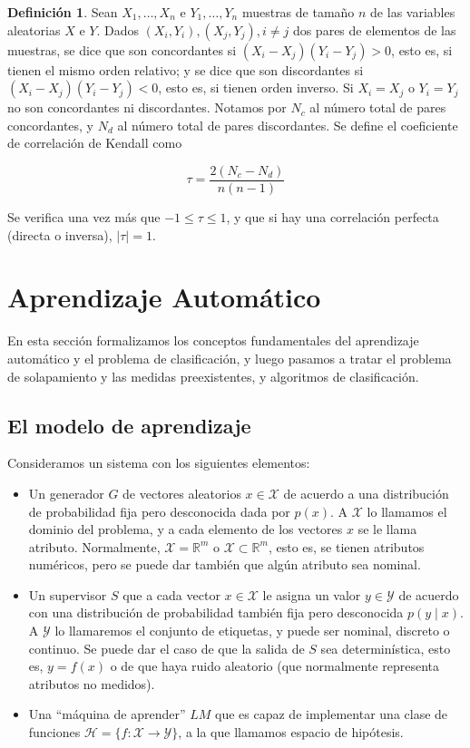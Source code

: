 \documentclass[a4paper,12pt]{report}
\theoremstyle{definition}
\newtheorem{dfn}{Definición}
\begin{document}
\begin{dfn}
  Sean $X_1, \ldots, X_n$ e $Y_1, \ldots, Y_n$ muestras de tamaño $n$ de las variables aleatorias $X$ e $Y$.
  Dados $(X_i, Y_i), (X_j, Y_j), i \neq j$ dos pares de elementos de las muestras, se dice que son concordantes si $(X_i-X_j)(Y_i-Y_j) > 0$, esto es,
  si tienen el mismo orden relativo; y se dice que son discordantes si $(X_i-X_j)(Y_i-Y_j) < 0$, esto es,
  si tienen orden inverso. Si $X_i = X_j$ o $Y_i = Y_j$ no son concordantes ni discordantes.
  Notamos por $N_c$ al número total de pares concordantes, y $N_d$ al número total de pares discordantes.
  Se define el coeficiente de correlación de Kendall como

  $$ \tau = \frac{2(N_c - N_d)}{n(n-1)}$$
\end{dfn}

Se verifica una vez más que $-1 \leq \tau \leq 1$, y que si hay una correlación perfecta (directa o inversa), $\lvert \tau \rvert = 1$.

\section{Aprendizaje Automático}
\label{sec:ml}

En esta sección formalizamos los conceptos fundamentales del aprendizaje automático y el problema de clasificación, y luego pasamos a tratar el problema de solapamiento y las medidas preexistentes, y algoritmos de clasificación.

\subsection{El modelo de aprendizaje}
Consideramos un sistema con los siguientes elementos\cite{cherkassky2007learning, shalev2014understanding, vapnik1998statistical}:
\begin{itemize}
\item Un generador $G$ de vectores aleatorios $x \in \mathcal{X}$
  de acuerdo a una distribución de probabilidad fija pero desconocida dada por $p(x)$. A $\mathcal{X}$ lo llamamos el dominio del problema, y a cada elemento de los vectores $x$ se le llama atributo. Normalmente, $\mathcal{X} = \mathbb{R}^m$ o $\mathcal{X} \subset \mathbb{R}^m$, esto es, se tienen atributos numéricos, pero se puede dar también que algún atributo sea nominal.
\item Un supervisor $S$ que a cada vector $x \in \mathcal{X}$ le asigna un valor $y \in \mathcal{Y}$ de acuerdo con una distribución de probabilidad también fija pero desconocida $p(y\mid x)$. A $\mathcal{Y}$ lo llamaremos el conjunto de etiquetas, y puede ser nominal, discreto o continuo. Se puede dar el caso de que la salida de $S$ sea determinística, esto es, $y=f(x)$ o de que haya ruido aleatorio (que normalmente representa atributos no medidos).
\item Una ``máquina de aprender'' $LM$ que es capaz de implementar una clase de funciones $\mathcal{H} = \lbrace f : \mathcal{X} \rightarrow \mathcal{Y} \rbrace$, a la que llamamos espacio de hipótesis.
\end{itemize}
\end{document}
